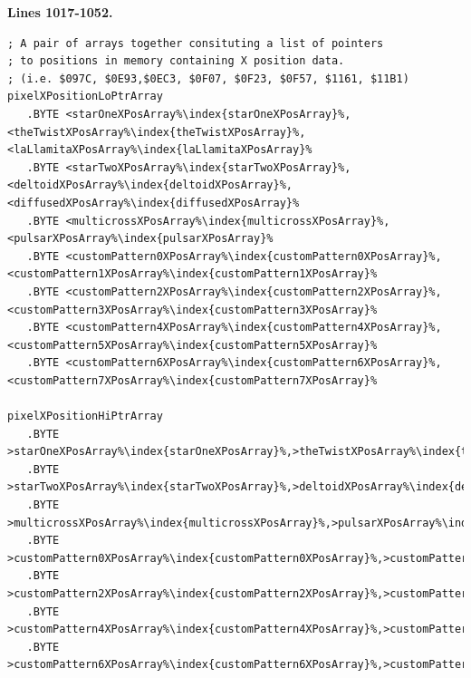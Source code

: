 \clearpage
\textbf{Lines 1017-1052. } 
\begin{lstlisting}[escapechar=\%,caption = All the pattern data structures in Psychedelia organized into a set of arrays.  We use these arrays to choose the correct user-selected pattern at painting time.]
; A pair of arrays together consituting a list of pointers
; to positions in memory containing X position data.
; (i.e. $097C, $0E93,$0EC3, $0F07, $0F23, $0F57, $1161, $11B1)
pixelXPositionLoPtrArray
   .BYTE <starOneXPosArray%\index{starOneXPosArray}%,<theTwistXPosArray%\index{theTwistXPosArray}%,<laLlamitaXPosArray%\index{laLlamitaXPosArray}%
   .BYTE <starTwoXPosArray%\index{starTwoXPosArray}%,<deltoidXPosArray%\index{deltoidXPosArray}%,<diffusedXPosArray%\index{diffusedXPosArray}%
   .BYTE <multicrossXPosArray%\index{multicrossXPosArray}%,<pulsarXPosArray%\index{pulsarXPosArray}%
   .BYTE <customPattern0XPosArray%\index{customPattern0XPosArray}%,<customPattern1XPosArray%\index{customPattern1XPosArray}%
   .BYTE <customPattern2XPosArray%\index{customPattern2XPosArray}%,<customPattern3XPosArray%\index{customPattern3XPosArray}%
   .BYTE <customPattern4XPosArray%\index{customPattern4XPosArray}%,<customPattern5XPosArray%\index{customPattern5XPosArray}%
   .BYTE <customPattern6XPosArray%\index{customPattern6XPosArray}%,<customPattern7XPosArray%\index{customPattern7XPosArray}%

pixelXPositionHiPtrArray 
   .BYTE >starOneXPosArray%\index{starOneXPosArray}%,>theTwistXPosArray%\index{theTwistXPosArray}%,>laLlamitaXPosArray%\index{laLlamitaXPosArray}%
   .BYTE >starTwoXPosArray%\index{starTwoXPosArray}%,>deltoidXPosArray%\index{deltoidXPosArray}%,>diffusedXPosArray%\index{diffusedXPosArray}%
   .BYTE >multicrossXPosArray%\index{multicrossXPosArray}%,>pulsarXPosArray%\index{pulsarXPosArray}%
   .BYTE >customPattern0XPosArray%\index{customPattern0XPosArray}%,>customPattern1XPosArray%\index{customPattern1XPosArray}%
   .BYTE >customPattern2XPosArray%\index{customPattern2XPosArray}%,>customPattern3XPosArray%\index{customPattern3XPosArray}%
   .BYTE >customPattern4XPosArray%\index{customPattern4XPosArray}%,>customPattern5XPosArray%\index{customPattern5XPosArray}%
   .BYTE >customPattern6XPosArray%\index{customPattern6XPosArray}%,>customPattern7XPosArray%\index{customPattern7XPosArray}%



\end{lstlisting}
